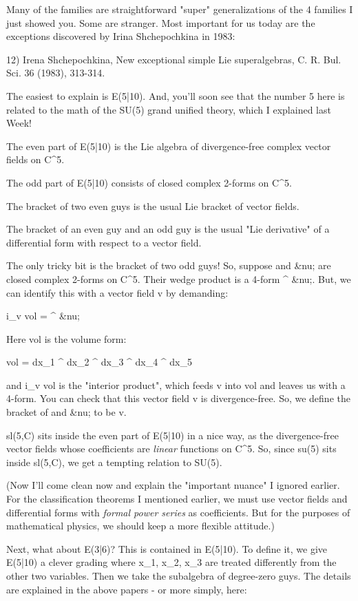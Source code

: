 Many of the families are straightforward "super" generalizations 
of the 4 families I just showed you.  Some are stranger.  Most 
important for us today are the exceptions discovered by Irina 
Shchepochkina in 1983:

12) Irena Shchepochkina, New exceptional simple Lie superalgebras, 
C. R. Bul. Sci. 36 (1983), 313-314.

The easiest to explain is E(5|10).  And, you'll soon see that the 
number 5 here is related to the math of the SU(5) grand unified 
theory, which I explained last Week!

The even part of E(5|10) is the Lie algebra of divergence-free complex 
vector fields on C^{5}.  

The odd part of E(5|10) consists of closed complex 2-forms on C^{5}.

The bracket of two even guys is the usual Lie bracket of vector 
fields. 

The bracket of an even guy and an odd guy is the usual "Lie 
derivative" of a differential form with respect to a vector field.   

The only tricky bit is the bracket of two odd guys!  So, suppose \mu 
and &nu; are closed complex 2-forms on C^{5}.  Their wedge
product is a 4-form \mu  ^ &nu;.  But, we can identify this with a vector
field v by demanding:

i_{v} vol = \mu  ^ &nu;

Here vol is the volume form:

vol = dx_{1} ^ dx_{2} ^ dx_{3} ^ dx_{4} ^ dx_{5}

and i_{v} vol is the "interior product", which feeds
v into vol and leaves us with a 4-form.  You can check that this
vector field v is divergence-free.  So, we define the bracket of \mu 
and &nu; to be v.

sl(5,C) sits inside the even part of E(5|10) in a nice way, as 
the divergence-free vector fields whose coefficients are \emph{linear} 
functions on C^{5}.   So, since su(5) sits inside sl(5,C), we get a 
tempting relation to SU(5).

(Now I'll come clean now and explain the "important nuance" I 
ignored earlier.  For the classification theorems I mentioned
earlier, we must use vector fields and differential forms with 
\emph{formal power series} as coefficients.    But for the purposes
of mathematical physics, we should keep a more flexible attitude.)

Next, what about E(3|6)?  This is contained in E(5|10).  To define 
it, we give E(5|10) a clever grading where x_{1}, x_{2}, 
x_{3} are 
treated differently from the other two variables.  Then we take 
the subalgebra of degree-zero guys.  The details are explained in 
the above papers - or more simply, here:

